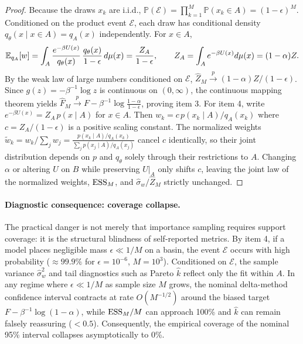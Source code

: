 \begin{proof}
Because the draws $x_k$ are i.i.d., $\mathbb P(\mathcal E)=\prod_{k=1}^M \mathbb P(x_k\in A)=(1-\epsilon)^M$. Conditioned on the product event $\mathcal E$, each draw has conditional density $q_\theta(x\mid x \in A)=q_A(x)$ independently. For $x\in A$,
\begin{equation}
\mathbb{E}_{q_A}[w]=\int_A\frac{e^{-\beta U(x)}}{q_\theta(x)}\,\frac{q_\theta(x)}{1-\epsilon}\,d\mu(x)=\frac{Z_A}{1-\epsilon},\qquad Z_A=\int_Ae^{-\beta U(x)}d\mu(x)=(1-\alpha)Z.
\end{equation}
By the weak law of large numbers conditioned on $\mathcal{E}$, $\hat{Z}_M \xrightarrow{p} (1-\alpha)Z/(1-\epsilon)$. Since $g(z) = -\beta^{-1}\log z$ is continuous on $(0, \infty)$, the continuous mapping theorem yields $\hat{F}_M \xrightarrow{p} F - \beta^{-1}\log\frac{1-\alpha}{1-\epsilon}$, proving item 3. For item 4, write $e^{-\beta U(x)}=Z_A\,p(x\mid A)$ for $x \in A$. Then $w_k=c\,p(x_k\mid A)/q_A(x_k)$ where $c=Z_A/(1-\epsilon)$ is a positive scaling constant. The normalized weights $\tilde{w}_k = w_k/\sum_j w_j = \frac{p(x_k\mid A)/q_A(x_k)}{\sum_j p(x_j\mid A)/q_A(x_j)}$ cancel $c$ identically, so their joint distribution depends on $p$ and $q_\theta$ solely through their restrictions to $A$. Changing $\alpha$ or altering $U$ on $B$ while preserving $U|_A$ only shifts $c$, leaving the joint law of the normalized weights, $\mathrm{ESS}_M$, and $\hat\sigma_w/\hat Z_M$ strictly unchanged.
\end{proof}

\paragraph{Diagnostic consequence: coverage collapse.}
The practical danger is not merely that importance sampling requires support coverage: it is the structural blindness of self-reported metrics. By item 4, if a model places negligible mass $\epsilon \ll 1/M$ on a basin, the event $\mathcal E$ occurs with high probability ($\approx99.9\%$ for $\epsilon=10^{-6}$, $M=10^3$). Conditioned on $\mathcal E$, the sample variance $\hat\sigma_w^2$ and tail diagnostics such as Pareto $\hat{k}$ \citep{vehtari2024psis} reflect only the fit within $A$. In any regime where $\epsilon \ll 1/M$ as sample size $M$ grows, the nominal delta-method confidence interval contracts at rate $O(M^{-1/2})$ around the biased target $F-\beta^{-1}\log(1-\alpha)$, while $\mathrm{ESS}_M/M$ can approach 100\% and $\hat{k}$ can remain falsely reassuring ($<0.5$). Consequently, the empirical coverage of the nominal 95\% interval collapses asymptotically to 0\%.

